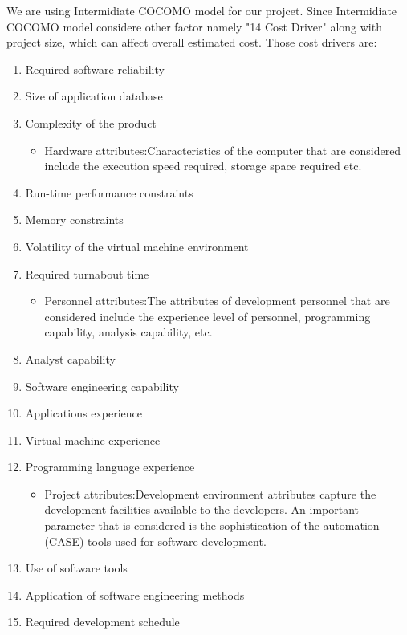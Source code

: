 \documentclass{article}
\begin{document}
We are using Intermidiate COCOMO model for our projcet. Since Intermidiate COCOMO model considere other factor namely  "14 Cost Driver" along with project size, which can affect overall estimated cost. Those cost drivers are:
\begin{enumerate}

  \begin{itemize}
    \item Product attributes:The characteristics of the product that are considered include the inherent complexity of the product, reliability requirements of the product, etc.
    \end{itemize}
    
     \item Required software reliability
    \item   Size of application database
    \item   Complexity of the product
    
 \begin{itemize}
    \item Hardware attributes:Characteristics of the computer that are considered include the execution speed required, storage space required etc.
 \end{itemize}
 
\item  Run-time performance constraints
\item Memory constraints
\item Volatility of the virtual machine environment
\item Required turnabout time


\begin{itemize}
   
\item Personnel attributes:The attributes of development personnel that are considered include
the experience level of personnel, programming capability, analysis capability,
etc.
\end{itemize}

\item Analyst capability
\item Software engineering capability
\item Applications experience
\item Virtual machine experience
\item Programming language experience

\begin{itemize}
   
\item Project attributes:Development environment attributes capture the
development facilities available to the developers. An important parameter that is considered is the sophistication of the automation (CASE) tools used for software development.
\end{itemize}

\item Use of software tools
\item Application of software engineering methods
\item Required development schedule


\end{enumerate}
\end{document}
